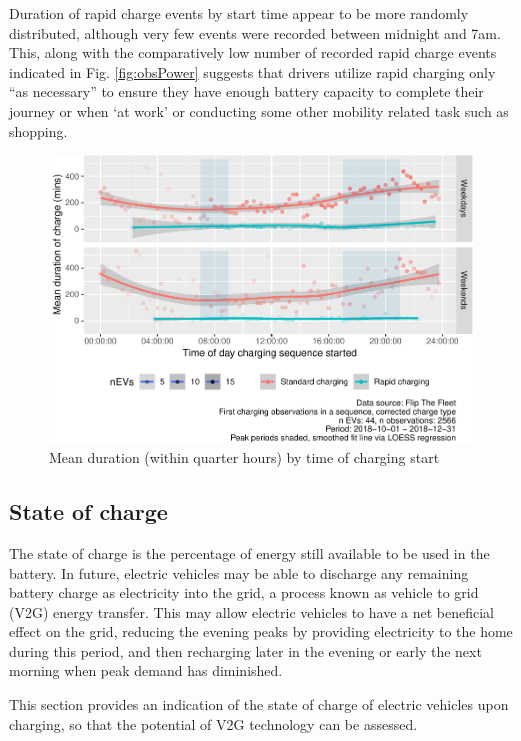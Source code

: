\documentclass[]{article}
\begin{document}
Duration of rapid charge events by start time appear to be more randomly distributed, although very few events were recorded between midnight and 7am. This, along with the comparatively low number of recorded rapid charge events indicated in Fig. \ref{fig:obsPower} suggests that drivers utilize rapid charging only ``as necessary'' to ensure they have enough battery capacity to complete their journey or when `at work' or conducting some other mobility related task such as shopping.

\begin{figure}
\centering
\includegraphics{EVBB_report_v1_files/figure-latex/durationTimeMean-1.pdf}
\caption{\label{fig:durationTimeMean}Mean duration (within quarter hours) by time of charging start}
\end{figure}

\hypertarget{SoC}{%
\subsection{State of charge}\label{SoC}}

The state of charge is the percentage of energy still available to be used in the battery. In future, electric vehicles may be able to discharge any remaining battery charge as electricity into the grid, a process known as vehicle to grid (V2G) energy transfer. This may allow electric vehicles to have a net beneficial effect on the grid, reducing the evening peaks by providing electricity to the home during this period, and then recharging later in the evening or early the next morning when peak demand has diminished.

This section provides an indication of the state of charge of electric vehicles upon charging, so that the potential of V2G technology can be assessed.
\end{document}

